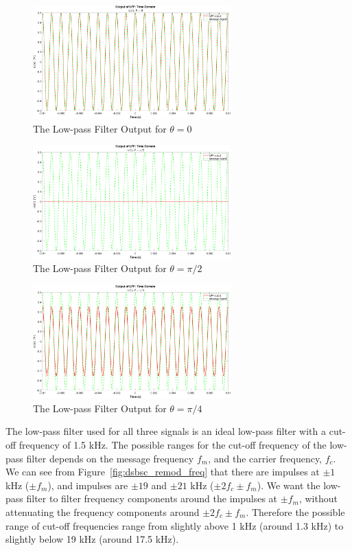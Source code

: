 \documentclass[12pt]{article}
\begin{document}
\begin{figure}[h]
    \centering
    \includegraphics[width=0.68\textwidth]{dsbsc_remod_lpf_theta_0}
    \caption{\label{fig:dsbsc_lpf_0}The Low-pass Filter Output for $\theta = 0$}
\end{figure}
\begin{figure}[h]
    \centering
    \includegraphics[width=0.68\textwidth]{dsbsc_remod_lpf_theta_1.5708}
    \caption{\label{fig:dsbsc_lpf_p2}The Low-pass Filter Output for $\theta = \pi/2$}
\end{figure}
\begin{figure}[h]
    \centering
    \includegraphics[width=0.68\textwidth]{dsbsc_remod_lpf_theta_0.7854}
    \caption{\label{fig:dsbsc_lpf_p4}The Low-pass Filter Output for $\theta = \pi/4$}
\end{figure} \clearpage

The low-pass filter used for all three signals is an ideal low-pass filter with a cut-off frequency of 1.5 kHz. The possible ranges for the cut-off frequency of the low-pass filter depends on the message frequency $f_m$, and the carrier frequency, $f_c$. We can see from Figure~\ref{fig:dsbsc_remod_freq} that there are impulses at $\pm 1$ kHz ($\pm f_m$), and impulses are $\pm 19$ and $\pm 21$ kHz ($\pm 2f_c \pm f_m$). We want the low-pass filter to filter frequency components around the impulses at $\pm f_m$, without attenuating the frequency components around $\pm 2f_c \pm f_m$. Therefore the possible range of cut-off frequencies range from slightly above 1 kHz (around 1.3 kHz) to slightly below 19 kHz (around 17.5 kHz).
\end{document}
